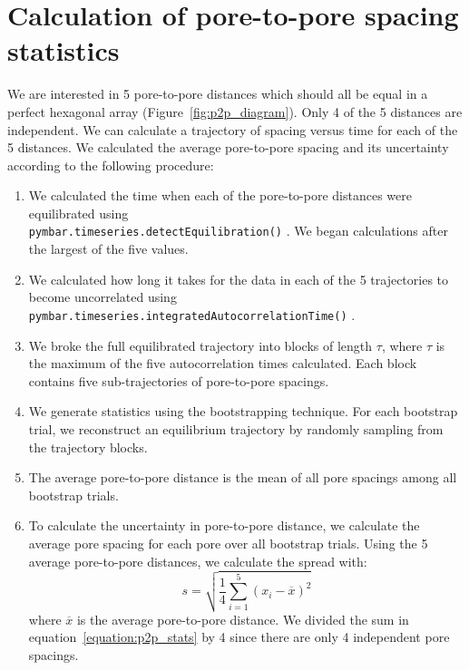 \documentclass{article}
\begin{document}
  \section{Calculation of pore-to-pore spacing statistics}\label{section:p2p_stats}
 
  We are interested in 5 pore-to-pore distances which should all be
  equal in a perfect hexagonal array (Figure~\ref{fig:p2p_diagram}). Only 4 of
  the 5 distances are independent. We can calculate a trajectory of spacing
  versus time for each of the 5 distances. We calculated the average pore-to-pore
  spacing and its uncertainty according to the following procedure:
   \begin{enumerate}
	\item We calculated the time when each of the pore-to-pore distances
	were equilibrated using \\ \texttt{pymbar.timeseries.detectEquilibration()}
	\cite{chodera_simple_2016,shirts_statistically_2008}. We began calculations
	after the largest of the five values.
	\item We calculated how long it takes for the data in each of the 5
	trajectories to become uncorrelated using \texttt{pymbar.timeseries.integratedAutocorrelationTime()}
	\cite{chodera_simple_2016,shirts_statistically_2008}. 
	\item We broke the full equilibrated trajectory into blocks of length $\tau$, where
	$\tau$ is the maximum of the five autocorrelation times calculated. Each block contains
	five sub-trajectories of pore-to-pore spacings.   
	\item We generate statistics using the bootstrapping technique. For
	each bootstrap trial, we reconstruct an equilibrium trajectory by randomly
	sampling from the trajectory blocks. 
	\item The average pore-to-pore distance is the mean of all pore
	spacings among all bootstrap trials.
	\item To calculate the uncertainty in pore-to-pore distance, we calculate the average 
	pore spacing for each pore over all bootstrap trials. Using the 5 average 
	pore-to-pore distances, we calculate the spread with:
	\begin{equation}
	s = \sqrt{\frac{1}{4} \sum_{i=1}^5 (x_i - \overline{x})^2} 
	\label{equation:p2p_stats}
	\end{equation}
	where $\overline{x}$ is the average pore-to-pore distance. We divided the sum in 
	equation~\ref{equation:p2p_stats} by 4 since there are only 4 independent pore
	spacings.
  \end{enumerate}
\end{document}
